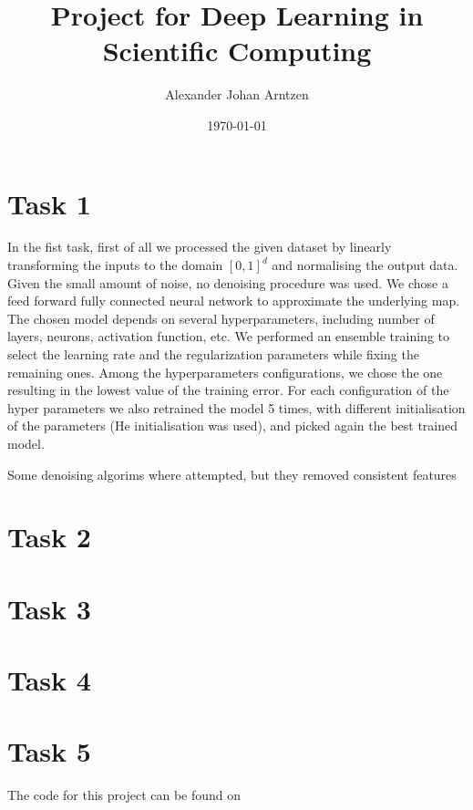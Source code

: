 \documentclass[a4paper]{article}
\title{Project for Deep Learning in Scientific Computing}
\author{Alexander Johan Arntzen }
\date{\today}
\begin{document}
\maketitle

\section*{Task 1}
In the fist task, first of all we processed the given dataset by linearly transforming the inputs to the domain $[0,1]^d$ and normalising the output data. Given the small amount of noise, no denoising procedure was used. We chose a feed forward fully connected neural network to approximate the underlying map. The chosen model depends  on several hyperparameters, including number of layers, neurons, activation function, etc. We performed an ensemble training to select the learning rate and the regularization parameters while fixing the remaining ones. Among the hyperparameters configurations, we chose the one resulting in the lowest value of the training error. For each configuration of the hyper parameters we also retrained the model 5 times, with different initialisation of the parameters (He initialisation was used), and picked again the best trained model.

Some denoising algorims where attempted, but they removed consistent features

\section*{Task 2}
\section*{Task 3}

\section*{Task 4}
\section*{Task 5}

The code for this project can be found on \cite{Arntzen2021}

\printbibliography
\end{document}
